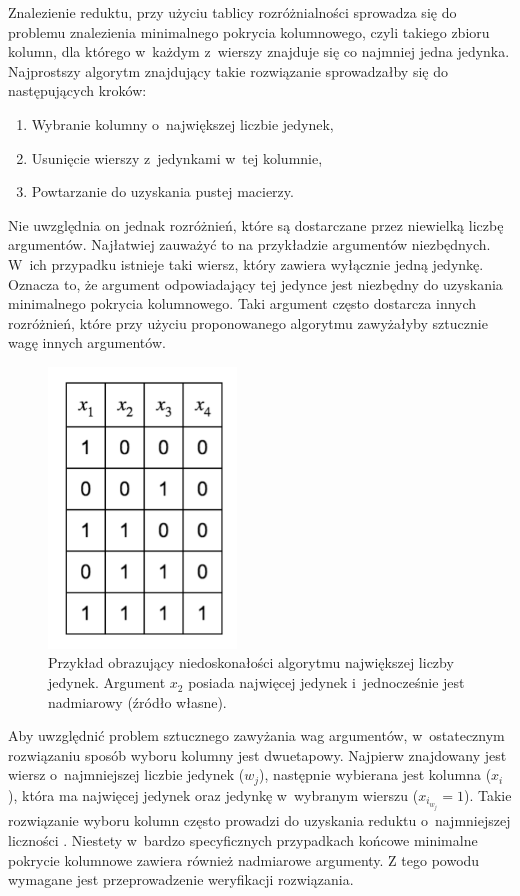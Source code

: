 Znalezienie reduktu,
przy użyciu tablicy rozróżnialności sprowadza się do problemu znalezienia minimalnego pokrycia kolumnowego,
czyli takiego zbioru kolumn,
dla którego w~każdym z~wierszy znajduje się co najmniej jedna jedynka.
Najprostszy algorytm znajdujący takie rozwiązanie sprowadzałby się do następujących kroków:
\begin{enumerate}
\item Wybranie kolumny o~największej liczbie jedynek,
\item Usunięcie wierszy z~jedynkami w~tej kolumnie,
\item Powtarzanie do uzyskania pustej macierzy.
\end{enumerate}

Nie uwzględnia on jednak rozróżnień,
które są dostarczane przez niewielką liczbę argumentów.
Najłatwiej zauważyć to na przykładzie argumentów niezbędnych.
W~ich przypadku istnieje taki wiersz,
który zawiera wyłącznie jedną jedynkę.
Oznacza to,
że argument odpowiadający tej jedynce jest niezbędny do uzyskania minimalnego pokrycia kolumnowego.
Taki argument często dostarcza innych rozróżnień,
które przy użyciu proponowanego algorytmu zawyżałyby sztucznie wagę innych argumentów.

\begin{figure}[H]
\centering
\includegraphics[width = 5cm]{chapter02/required-arguments.png}
\caption{Przykład obrazujący niedoskonałości algorytmu największej liczby jedynek.
Argument $x_2$ posiada najwięcej jedynek i~jednocześnie jest nadmiarowy (źródło własne).}
\end{figure}

Aby uwzględnić problem sztucznego zawyżania wag argumentów,
w~ostatecznym rozwiązaniu sposób wyboru kolumny jest dwuetapowy.
Najpierw znajdowany jest wiersz o~najmniejszej liczbie jedynek ($w_j$),
następnie wybierana jest kolumna ($x_i$),
która ma najwięcej jedynek oraz jedynkę w~wybranym wierszu ($x_{i_{w_j}} = 1$).
Takie rozwiązanie wyboru kolumn często prowadzi do uzyskania reduktu o~najmniejszej liczności \cite{unate-artykul}.
Niestety w~bardzo specyficznych przypadkach końcowe minimalne pokrycie kolumnowe zawiera również nadmiarowe argumenty.
Z tego powodu wymagane jest przeprowadzenie weryfikacji rozwiązania.

